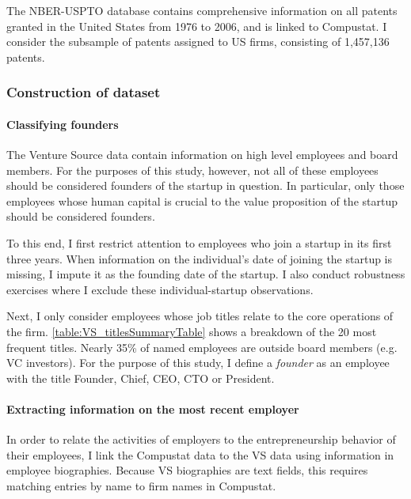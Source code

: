 \documentclass[11pt,english]{article}
\theoremstyle{remark}
\begin{document}
The NBER-USPTO database contains comprehensive information on all patents granted in the United States from 1976 to 2006, and is linked to Compustat. I consider the subsample of patents assigned to US firms, consisting of 1,457,136 patents. 

\subsubsection{Construction of dataset}

\paragraph{Classifying founders}

The Venture Source data contain information on high level employees and board members. For the purposes of this study, however, not all of these employees should be considered founders of the startup in question. In particular, only those employees whose human capital is crucial to the value proposition of the startup should be considered founders. 

To this end, I first restrict attention to employees who join a startup in its first three years. When information on the individual's date of joining the startup is missing, I impute it as the founding date of the startup. I also conduct robustness exercises where I exclude these individual-startup observations. 

Next, I only consider employees whose job titles relate to the core operations of the firm. \autoref{table:VS_titlesSummaryTable} shows a breakdown of the 20 most frequent titles. Nearly 35\% of named employees are outside board members (e.g. VC investors). For the purpose of this study, I define a \textit{founder} as an employee with the title Founder, Chief, CEO, CTO or President. 



\paragraph{Extracting information on the most recent employer}

In order to relate the activities of employers to the entrepreneurship behavior of their employees, I link the Compustat data to the VS data using information in employee biographies. Because VS biographies are text fields, this requires matching entries by name to firm names in Compustat.  
\end{document}

